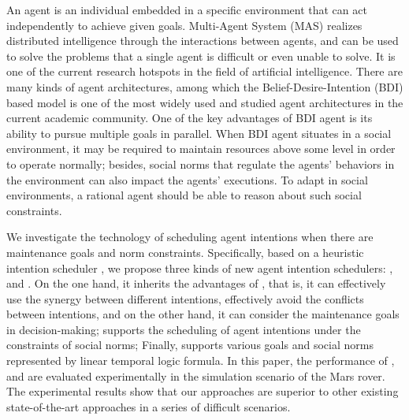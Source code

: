 \begin{abstract*}
    An agent is an individual embedded in a specific environment that can act independently to achieve given goals. Multi-Agent System (MAS) realizes distributed intelligence through the interactions between agents, and can be used to solve the problems that a single agent is difficult or even unable to solve. It is one of the current research hotspots in the field of artificial intelligence. There are many kinds of agent architectures, among which the Belief-Desire-Intention (BDI) based model is one of the most widely used and studied agent architectures in the current academic community.
    One of the key advantages of BDI agent is its ability to pursue multiple goals in parallel. When BDI agent situates in a social environment, it may be required to maintain resources above some level in order to operate normally; besides, social norms that regulate the agents' behaviors in the environment can also impact the agents' executions. To adapt in social environments, a rational agent should be able to reason about such social constraints.

    We investigate the technology of scheduling agent intentions when there are maintenance goals and norm constraints. Specifically, based on a heuristic intention scheduler \SA, we propose three kinds of new agent intention schedulers: \SAM, \SAN and \SAT. On the one hand, it inherits the advantages of \SA, that is, it can effectively use the synergy between different intentions, effectively avoid the conflicts between intentions, and on the other hand, it can consider the maintenance goals in decision-making; \SAN supports the scheduling of agent intentions under the constraints of social norms; Finally, \SAT supports various goals and social norms represented by linear temporal logic formula. In this paper, the performance of \SAM, \SAN and \SAT are evaluated experimentally in the simulation scenario of the Mars rover. The experimental results show that our approaches are superior to other existing state-of-the-art approaches in a series of difficult scenarios.
\end{abstract*}
